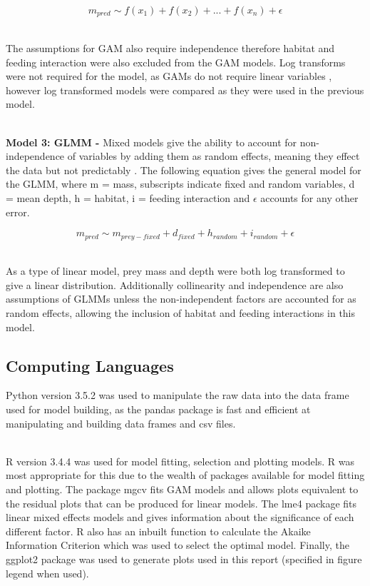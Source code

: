 \documentclass[11pt,a4paper]{article}
\begin{document}
		\begin{equation*}
			m_{pred} \sim f(x_{1}) + f(x_{2}) + ... + f(x_{n}) + \epsilon
		\end{equation*}
		
	\noindent ~\\ The assumptions for GAM also require independence therefore habitat and feeding interaction were also excluded from the GAM models. Log transforms were not required for the model, as GAMs do not require linear variables \citep{Zuur2009}, however log transformed models were compared as they were used in the previous model.
	
	\par \noindent ~\\ \textbf{Model 3: GLMM -} Mixed models give the ability to account for non-independence of variables by adding them as random effects, meaning they effect the data but not predictably \citep{Zuur2009}. The following equation gives the general model for the GLMM, where m = mass, subscripts indicate fixed and random variables, d = mean depth, h = habitat, i = feeding interaction and $\epsilon$ accounts for any other error.
	
		\begin{equation*}
			m_{pred} \sim m_{prey - fixed} + d_{fixed} + h_{random} + i_{random} + \epsilon
		\end{equation*}
		
	\noindent ~\\ As a type of linear model, prey mass and depth were both log transformed to give a linear distribution. Additionally collinearity and independence are also assumptions of GLMMs unless the non-independent factors are accounted for as random effects, allowing the inclusion of habitat and feeding interactions in this model. 


	\subsection{Computing Languages}
	
	\par \noindent Python version 3.5.2 \citep{PythonCoreTeam2018} was used to manipulate the raw data into the data frame used for model building, as the pandas package \citep{mckinney-proc-scipy-2010} is fast and efficient at manipulating and building data frames and csv files.
	\par \noindent ~\\R version 3.4.4 \citep{RCoreTeam2018} was used for model fitting, selection and plotting models. R was most appropriate for this due to the wealth of packages available for model fitting and plotting. The package mgcv \citep{Wood2011} fits GAM models and allows plots equivalent to the residual plots that can be produced for linear models. The lme4 package \citep{Bates2015} fits linear mixed effects models and gives information about the significance of each different factor. R also has an inbuilt function to calculate the Akaike Information Criterion which was used to select the optimal model. Finally, the ggplot2 \citep{Wickham2016} package was used to generate plots used in this report (specified in figure legend when used).
	
\end{document}

